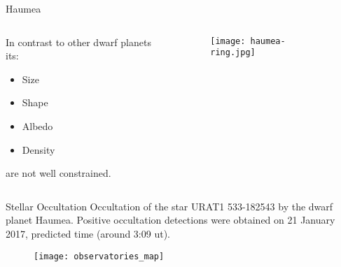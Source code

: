 \begin{frame}[c]{Haumea}{}

	\begin{columns}[t]
	\begin{column}[T]{5cm}
	\vspace{0.3cm}
	 In contrast to other dwarf planets its:
	\begin{itemize}[<+->]
		\item Size 
		\item Shape
		\item Albedo
		\item Density
	\end{itemize}
	are not well constrained.

	\end{column}

	\begin{column}[T]{5cm}
		\vspace{-0.5 cm}
		\begin{figure}[tb]
		\centering
		\texttt{[image: haumea-ring.jpg]}
	\end{figure}

	\end{column}
	\end{columns}

\end{frame}

\begin{frame}[c]{Stellar Occultation}
Occultation of the star URAT1 533-182543 by the dwarf planet Haumea. Positive occultation detections were obtained on 21 January 2017, predicted time (around 3:09 ut).
	\begin{figure}[tb]
		\centering
		\texttt{[image: observatories\_map]}
	\end{figure}
\end{frame}


